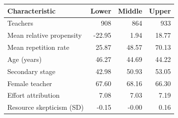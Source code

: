 \begin{tabular}{@{}p{5.2cm}rrr@{}}
\toprule
Characteristic & Lower & Middle & Upper \\
\midrule
Teachers & 908 & 864 & 933 \\
Mean relative propensity & -22.95 & 1.94 & 18.77 \\
Mean repetition rate & 25.87 & 48.57 & 70.13 \\
Age (years) & 46.27 & 44.69 & 44.22 \\
Secondary stage & 42.98 & 50.93 & 53.05 \\
Female teacher & 67.60 & 68.16 & 66.30 \\
Effort attribution & 7.08 & 7.03 & 7.19 \\
Resource skepticism (SD) & -0.15 & -0.00 & 0.16 \\
\bottomrule
\end{tabular}
